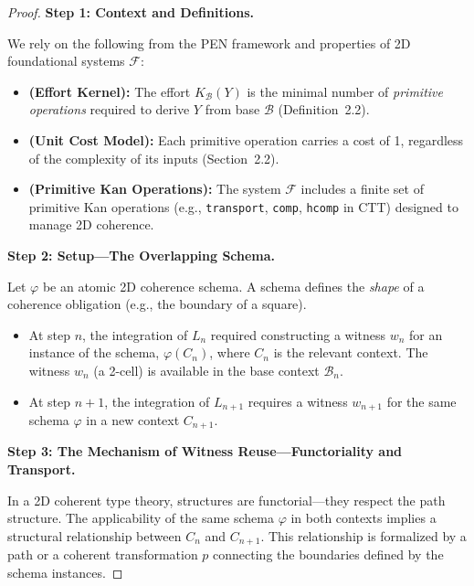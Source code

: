 \documentclass[11pt]{article}
\theoremstyle{definition}
\theoremstyle{remark}
\begin{document}
\begin{proof}
\textbf{Step 1: Context and Definitions.}

We rely on the following from the PEN framework and properties of 2D foundational systems $\mathcal{F}$:

\begin{itemize}
\item[\textbf{P1}] \textbf{(Effort Kernel):} The effort $K_{\mathcal{B}}(Y)$ is the minimal number of \emph{primitive operations} required to derive $Y$ from base $\mathcal{B}$ (Definition~2.2).

\item[\textbf{P2}] \textbf{(Unit Cost Model):} Each primitive operation carries a cost of 1, regardless of the complexity of its inputs (Section~2.2).

\item[\textbf{P3}] \textbf{(Primitive Kan Operations):} The system $\mathcal{F}$ includes a finite set of primitive Kan operations (e.g., \texttt{transport}, \texttt{comp}, \texttt{hcomp} in CTT) designed to manage 2D coherence.
\end{itemize}

\textbf{Step 2: Setup---The Overlapping Schema.}

Let $\varphi$ be an atomic 2D coherence schema. A schema defines the \emph{shape} of a coherence
obligation (e.g., the boundary of a square).

\begin{itemize}
\item At step $n$, the integration of $L_n$ required constructing a witness $w_n$ for an instance of
the schema, $\varphi(C_n)$, where $C_n$ is the relevant context. The witness $w_n$ (a 2-cell) is available
in the base context $\mathcal{B}_n$.

\item At step $n+1$, the integration of $L_{n+1}$ requires a witness $w_{n+1}$ for the same schema $\varphi$
in a new context $C_{n+1}$.
\end{itemize}

\textbf{Step 3: The Mechanism of Witness Reuse---Functoriality and Transport.}

In a 2D coherent type theory, structures are functorial---they respect the path structure. The
applicability of the same schema $\varphi$ in both contexts implies a structural relationship between
$C_n$ and $C_{n+1}$. This relationship is formalized by a path or a coherent transformation $p$
connecting the boundaries defined by the schema instances.


\end{proof}
\end{document}
